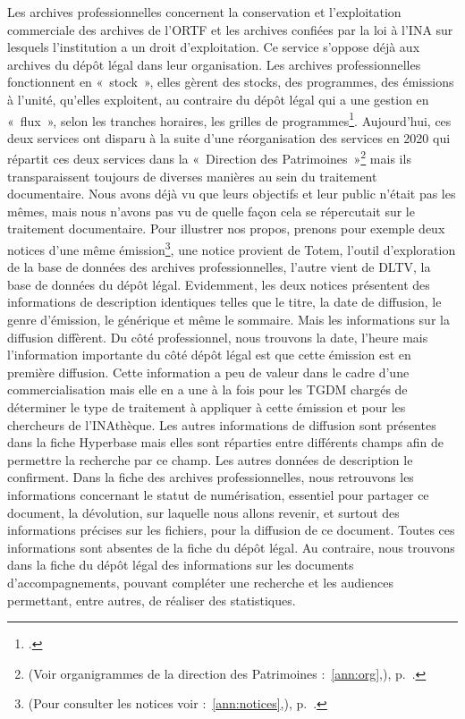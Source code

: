 Les archives professionnelles concernent la conservation et l’exploitation commerciale des archives de l’ORTF et les archives confiées par la loi à l’INA sur lesquels l’institution a un droit d’exploitation. Ce service s’oppose déjà aux archives du dépôt légal dans leur organisation. Les archives professionnelles fonctionnent en « stock », elles gèrent des stocks, des programmes, des émissions à l’unité, qu’elles exploitent, au contraire du dépôt légal qui a une gestion en « flux », selon les tranches horaires, les grilles de programmes\footcite[][23]{varra2023}. Aujourd’hui, ces deux services ont disparu à la suite d’une réorganisation des services en 2020 qui répartit ces deux services dans la « Direction des Patrimoines »\footnote{(Voir organigrammes de la direction des Patrimoines :~\ref{ann:org},), p.~\pageref{ann:org}.} mais ils transparaissent toujours de diverses manières au sein du traitement documentaire. Nous avons déjà vu que leurs objectifs et leur public n’était pas les mêmes, mais nous n’avons pas vu de quelle façon cela se répercutait sur le traitement documentaire. Pour illustrer nos propos, prenons pour exemple deux notices d’une même émission\footnote{(Pour consulter les notices voir :~\ref{ann:notices},), p.~\pageref{ann:notices}.}, une notice provient de Totem, l'outil d'exploration de la base de données des archives professionnelles, l’autre vient de DLTV, la base de données du dépôt légal. Evidemment, les deux notices présentent des informations de description identiques telles que le titre, la date de diffusion, le genre d’émission, le générique et même le sommaire. Mais les informations sur la diffusion diffèrent. Du côté professionnel, nous trouvons la date, l’heure mais l’information importante du côté dépôt légal est que cette émission est en première diffusion. Cette information a peu de valeur dans le cadre d’une commercialisation mais elle en a une à la fois pour les TGDM chargés de déterminer le type de traitement à appliquer à cette émission et pour les chercheurs de l’INAthèque. Les autres informations de diffusion sont présentes dans la fiche Hyperbase mais elles sont réparties entre différents champs afin de permettre la recherche par ce champ. Les autres données de description le confirment. Dans la fiche des archives professionnelles, nous retrouvons les informations concernant le statut de numérisation, essentiel pour partager ce document, la dévolution, sur laquelle nous allons revenir, et surtout des informations précises sur les fichiers, pour la diffusion de ce document. Toutes ces informations sont absentes de la fiche du dépôt légal. Au contraire, nous trouvons dans la fiche du dépôt légal des informations sur les documents d’accompagnements, pouvant compléter une recherche et les audiences permettant, entre autres, de réaliser des statistiques.
 
